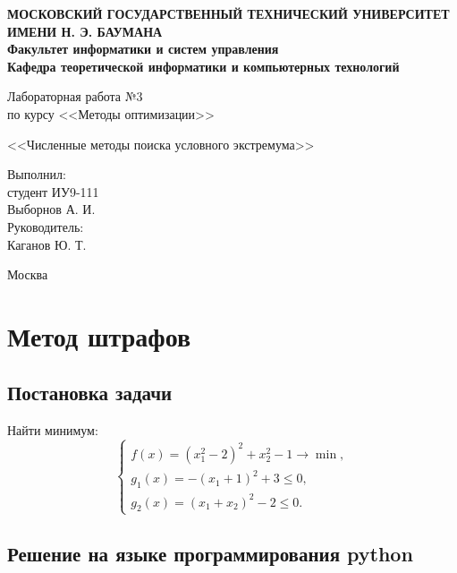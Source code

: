 \documentclass[12pt,a4paper,oneside]{extarticle}
\begin{document}
\pgfplotsset{compat=1.8}

\thispagestyle{empty}
\newpage
{
\centering


\textbf{
МОСКОВСКИЙ ГОСУДАРСТВЕННЫЙ ТЕХНИЧЕСКИЙ УНИВЕРСИТЕТ ИМЕНИ Н. Э. БАУМАНА \\
Факультет информатики и систем управления \\
Кафедра теоретической информатики и компьютерных технологий}
\bigskip
\bigskip
\bigskip
\bigskip
\bigskip
\bigskip
\bigskip

\vfill


Лабораторная работа №3 \\
по курсу <<Методы оптимизации>>

\bigskip

{\large <<Численные методы поиска условного экстремума>>}
\bigskip

\vfill



\hfill\parbox{4cm} {
Выполнил:\\
студент ИУ9-111 \hfill \\
Выборнов А. И.\hfill \medskip\\
Руководитель:\\
Каганов Ю. Т.\hfill
}


\vspace{\fill}

Москва \number\year
\clearpage
}



\clearpage

\section{Метод штрафов}
    \subsection{Постановка задачи}
        Найти минимум:
        \begin{equation*}
            \begin{cases}
                f(x) = (x_1^2-2)^2 + x_2^2 - 1 \rightarrow \min, \\
                g_1(x) = -(x_1 + 1)^2 + 3 \le 0, \\
                g_2(x) = (x_1 + x_2)^2 - 2 \le 0.
            \end{cases}
        \end{equation*}
        

    \subsection{Решение на языке программирования python}
        
\end{document}

